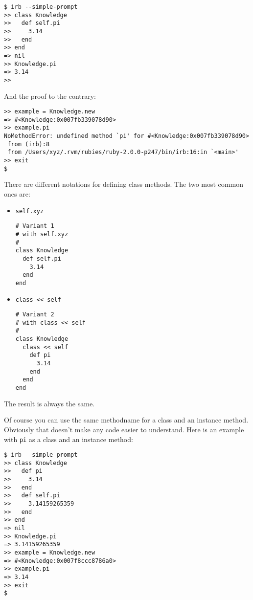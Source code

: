 \documentclass[a4paper]{book}
\begin{document}
\begin{shaded}\begin{verbatim}
$ irb --simple-prompt
>> class Knowledge
>>   def self.pi
>>     3.14
>>   end
>> end
=> nil
>> Knowledge.pi
=> 3.14
>>
\end{verbatim}\end{shaded}

And the proof to the contrary:

\begin{shaded}\begin{verbatim}
>> example = Knowledge.new
=> #<Knowledge:0x007fb339078d90>
>> example.pi
NoMethodError: undefined method `pi' for #<Knowledge:0x007fb339078d90>
 from (irb):8
 from /Users/xyz/.rvm/rubies/ruby-2.0.0-p247/bin/irb:16:in `<main>'
>> exit
$
\end{verbatim}\end{shaded}

There are different notations for defining class methods. The two most common ones are:

\begin{itemize}
\item
  \texttt{self.xyz}

\begin{shaded}\begin{verbatim}
# Variant 1
# with self.xyz
#
class Knowledge
  def self.pi
    3.14
  end
end
\end{verbatim}\end{shaded}
\item
  \texttt{class \textless{}\textless{} self}

\begin{shaded}\begin{verbatim}
# Variant 2
# with class << self
#
class Knowledge
  class << self
    def pi
      3.14
    end
  end
end
\end{verbatim}\end{shaded}
\end{itemize}

The result is always the same.

Of course you can use the same methodname for a class and an instance method. Obviously that doesn't make any code easier to understand. Here is an example with \texttt{pi} as a class and an instance method:

\begin{shaded}\begin{verbatim}
$ irb --simple-prompt
>> class Knowledge
>>   def pi
>>     3.14
>>   end
>>   def self.pi
>>     3.14159265359
>>   end
>> end
=> nil
>> Knowledge.pi
=> 3.14159265359
>> example = Knowledge.new
=> #<Knowledge:0x007f8ccc8786a0>
>> example.pi
=> 3.14
>> exit
$
\end{verbatim}\end{shaded}
\end{document}
